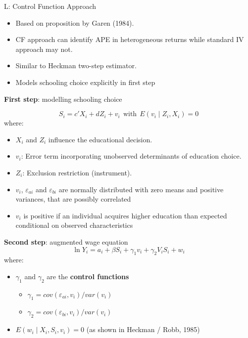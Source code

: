 \documentclass[10pt,ignorenonframetext,]{beamer}
\providecommand{\tightlist}{%
  \setlength{\itemsep}{0pt}\setlength{\parskip}{0pt}}
\begin{document}
\begin{frame}[allowframebreaks]{L: Control Function Approach}
\protect\hypertarget{l-control-function-approach}{}

\begin{itemize}
\tightlist
\item
  Based on proposition by Garen (1984).
\item
  CF approach can identify APE in heterogeneous returns while standard
  IV approach may not.
\item
  Similar to Heckman two-step estimator.
\item
  Models schooling choice explicitly in first step
\end{itemize}

\textbf{First step}: modelling schooling choice

\[S_i = c'X_i + dZ_i + v_i ~~\text{with}~~ E(v_i \mid Z_i, X_i) = 0\]
where:

\begin{itemize}
\item
  \(X_i\) and \(Z_i\) influence the educational decision.
\item
  \(v_i\): Error term incorporating unobserved determinants of education
  choice.
\item
  \(Z_i\): Exclusion restriction (instrument).
\item
  \(v_i\), \(\varepsilon_{ai}\) and \(\varepsilon_{bi}\) are normally
  distributed with zero means and positive variances, that are possibly
  correlated
\item
  \(v_i\) is positive if an individual acquires higher education than
  expected conditional on observed characteristics
\end{itemize}

\textbf{Second step}: augmented wage equation
\[\ln Y_i = a_i + \beta S_i + \gamma_1 v_i + \gamma_2 V_iS_i + w_i\]
where:

\begin{itemize}
\item
  \(\gamma_1\) and \(\gamma_2\) are the \textbf{control functions}

  \begin{itemize}
  \item
    \(\gamma_1 = cov(\varepsilon_{ai}, v_i) /var(v_i)\)
  \item
    \(\gamma_2 = cov(\varepsilon_{bi}, v_i) /var(v_i)\)
  \end{itemize}
\item
  \(E(w_i \mid X_i, S_i, v_i) = 0\) (as shown in Heckman / Robb, 1985)
\end{itemize}

\end{frame}
\end{document}
